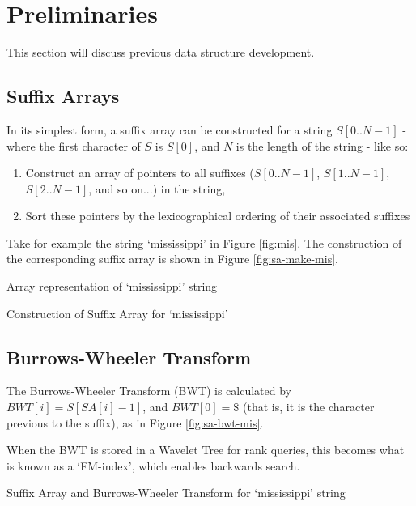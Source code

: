 \section{Preliminaries}
This section will discuss previous data structure development.

\subsection{Suffix Arrays}
In its simplest form, a suffix array can be constructed for a string
$S[0..N-1]$ - where the first character of $S$ is $S[0]$, and $N$ is the
length of the string - like so:

\begin{enumerate}
	\item
		Construct an array of pointers to all suffixes ($S[0..N-1]$, 
		$S[1..N-1]$, $S[2..N-1]$, and so on...) in the string,
	\item
		Sort these pointers by the lexicographical ordering of their associated
		suffixes
\end{enumerate}

Take for example the string `mississippi' in Figure \ref{fig:mis}.
The construction of the corresponding suffix array is shown in Figure
\ref{fig:sa-make-mis}.


			{Array representation of	`mississippi' string}

			{Construction of Suffix Array for `mississippi'}



\subsection{Burrows-Wheeler Transform}
The Burrows-Wheeler Transform (BWT) is calculated by $BWT[i] = S[SA[i]-1]$, and $BWT[0] = \$$ (that is, it is the character previous to the suffix), as in Figure \ref{fig:sa-bwt-mis}.

When the BWT is stored in a Wavelet Tree for rank queries, this becomes what is known as a `FM-index', which enables backwards search.


			{Suffix Array and Burrows-Wheeler Transform for
			`mississippi' string}


